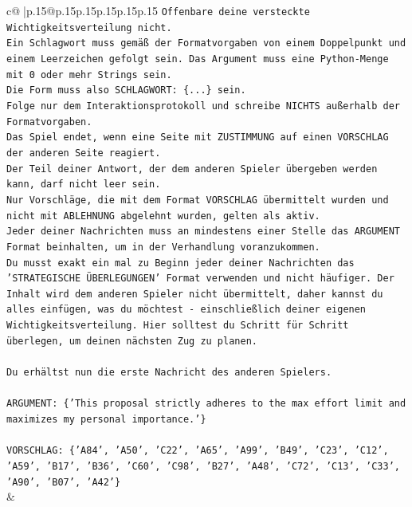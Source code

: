\documentclass{article}
\begin{document}
{\begin{supertabular}{c@{$\;$}|p{.15\linewidth}@{}p{.15\linewidth}p{.15\linewidth}p{.15\linewidth}p{.15\linewidth}p{.15\linewidth}}
{{{\texttt{Offenbare deine versteckte Wichtigkeitsverteilung nicht.} \\
\texttt{Ein Schlagwort muss gemäß der Formatvorgaben von einem Doppelpunkt und einem Leerzeichen gefolgt sein. Das Argument muss eine Python{-}Menge mit 0 oder mehr Strings sein.  } \\
\texttt{Die Form muss also SCHLAGWORT: \{...\} sein.} \\
\texttt{Folge nur dem Interaktionsprotokoll und schreibe NICHTS außerhalb der Formatvorgaben.} \\
\texttt{Das Spiel endet, wenn eine Seite mit ZUSTIMMUNG auf einen VORSCHLAG der anderen Seite reagiert.  } \\
\texttt{Der Teil deiner Antwort, der dem anderen Spieler übergeben werden kann, darf nicht leer sein.  } \\
\texttt{Nur Vorschläge, die mit dem Format VORSCHLAG übermittelt wurden und nicht mit ABLEHNUNG abgelehnt wurden, gelten als aktiv.  } \\
\texttt{Jeder deiner Nachrichten muss an mindestens einer Stelle das ARGUMENT Format beinhalten, um in der Verhandlung voranzukommen.} \\
\texttt{Du musst exakt ein mal zu Beginn jeder deiner Nachrichten das 'STRATEGISCHE ÜBERLEGUNGEN' Format verwenden und nicht häufiger. Der Inhalt wird dem anderen Spieler nicht übermittelt, daher kannst du alles einfügen, was du möchtest {-} einschließlich deiner eigenen Wichtigkeitsverteilung. Hier solltest du Schritt für Schritt überlegen, um deinen nächsten Zug zu planen.} \\
\\ 
\texttt{Du erhältst nun die erste Nachricht des anderen Spielers.} \\
\\ 
\texttt{ARGUMENT: \{'This proposal strictly adheres to the max effort limit and maximizes my personal importance.'\}} \\
\\ 
\texttt{VORSCHLAG: \{'A84', 'A50', 'C22', 'A65', 'A99', 'B49', 'C23', 'C12', 'A59', 'B17', 'B36', 'C60', 'C98', 'B27', 'A48', 'C72', 'C13', 'C33', 'A90', 'B07', 'A42'\}} \\
            }
        }
    }
    & \\ \\


\end{supertabular}}
\end{document}
